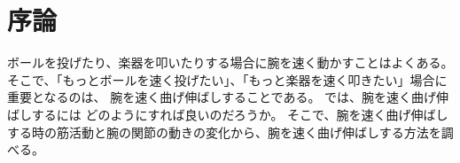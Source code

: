\documentclass{jsarticle}
\begin{document}
\section{序論}
ボールを投げたり、楽器を叩いたりする場合に腕を速く動かすことはよくある。そこで、「もっとボールを速く投げたい」、「もっと楽器を速く叩きたい」場合に重要となるのは、
腕を速く曲げ伸ばしすることである。
では、腕を速く曲げ伸ばしするには
どのようにすれば良いのだろうか。
そこで、腕を速く曲げ伸ばしする時の筋活動と腕の関節の動きの変化から、腕を速く曲げ伸ばしする方法を調べる。
\end{document}
